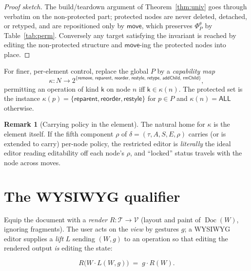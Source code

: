 \documentclass[11pt]{article}
\DeclareMathOperator{\Doc}{Doc}
\newcommand{\Tree}{\mathcal{T}}              %
\newcommand{\View}{\mathcal{V}}
\newcommand{\move}{\mathsf{move}}
\newcommand{\Render}{R}
\newcommand{\Lift}{L}
\theoremstyle{definition}
\newtheorem{remark}[definition]{Remark}
\theoremstyle{plain}
\begin{document}
\begin{proof}[Proof sketch]
The build/teardown argument of Theorem~\ref{thm:univ} goes through verbatim on
the non-protected part; protected nodes are never deleted, detached, or retyped,
and are repositioned only by $\move$, which preserves $\Phi^{\theta}_{P}$ by
Table~\ref{tab:perm}. Conversely any target satisfying the invariant is reached
by editing the non-protected structure and $\move$-ing the protected nodes into
place.
\end{proof}

For finer, per-element control, replace the global $P$ by a \emph{capability map}
\[
  \kappa\colon N \longrightarrow
  2^{\{\mathsf{remove},\,\mathsf{reparent},\,\mathsf{reorder},\,\mathsf{restyle},\,\mathsf{retype},\,\mathsf{addChild},\,\mathsf{rmChild}\}},
\]
permitting an operation of kind $\mathsf{k}$ on node $n$ iff
$\mathsf{k}\in\kappa(n)$. The protected set is the instance
$\kappa(p)=\{\mathsf{reparent},\mathsf{reorder},\mathsf{restyle}\}$ for $p\in P$
and $\kappa(n)=\mathsf{ALL}$ otherwise.

\begin{remark}[Carrying policy in the element]
The natural home for $\kappa$ is the element itself. If the fifth component
$\rho$ of $\delta=(\tau,A,S,E,\rho)$ carries (or is extended to carry) per-node
policy, the restricted editor is \emph{literally} the ideal editor reading
editability off each node's $\rho$, and ``locked'' status travels with the node
across moves.
\end{remark}

\section{The WYSIWYG qualifier}\label{sec:wysiwyg}
Equip the document with a \emph{render} $\Render\colon\Tree\to\View$ (layout and
paint of $\Doc(W)$, ignoring fragments). The user acts on the \emph{view} by
gestures $g$; a WYSIWYG editor supplies a \emph{lift} $\Lift$ sending $(W,g)$ to
an operation so that editing the rendered output \emph{is} editing the state:

\begin{center}
\end{center}
\[
  \Render\bigl(W\cdot \Lift(W,g)\bigr)\;=\;g\cdot \Render(W).
\]
\end{document}
